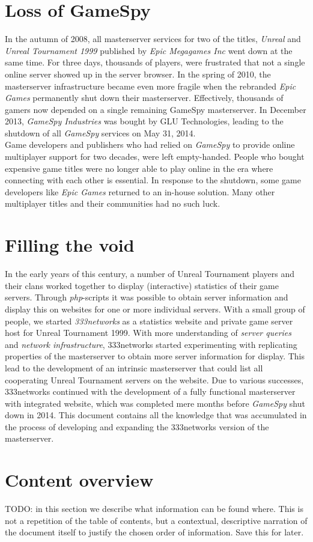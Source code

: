 \section{Loss of GameSpy}
In the autumn of 2008, all masterserver services for two of the titles, \emph{Unreal} and \emph{Unreal Tournament 1999} published by \emph{Epic Megagames Inc\textsuperscript{\textcopyright}} went down at the same time. For three days, thousands of players, were frustrated that not a single online server showed up in the server browser\cite{bu2008,ou2008}. In the spring of 2010, the masterserver infrastructure became even more fragile when the rebranded \emph{Epic Games} permanently shut down their masterserver. Effectively, thousands of gamers now depended on a single remaining GameSpy masterserver. In December 2013, \emph{GameSpy Industries} was bought by GLU Technologies, leading to the shutdown of all \emph{GameSpy} services on May 31, 2014\cite{nutt2014, stapleton2013}.\\

Game developers and publishers who had relied on \emph{GameSpy} to provide online multiplayer support for two decades, were left empty-handed. People who bought expensive game titles were no longer able to play online in the era where connecting with each other is essential. In response to the shutdown, some game developers like \emph{Epic Games} returned to an in-house solution. Many other multiplayer titles and their communities had no such luck.

\section{Filling the void}
In the early years of this century, a number of Unreal Tournament players and their clans worked together to display (interactive) statistics of their game servers. Through \emph{php}-scripts it was possible to obtain server information and display this on websites for one or more individual servers. With a small group of people, we started \emph{333networks} as a statistics website and private game server host for Unreal Tournament 1999. With more understanding of \emph{server queries} and \emph{network infrastructure}, 333networks started experimenting with replicating properties of the masterserver to obtain more server information for display. This lead to the development of an intrinsic masterserver that could list all cooperating Unreal Tournament servers on the website. Due to various successes, 333networks continued with the development of a fully functional masterserver with integrated website, which was completed mere months before \emph{GameSpy} shut down in 2014. This document contains all the knowledge that was accumulated in the process of developing and expanding the 333networks version of the masterserver.

\section{Content overview}
TODO: in this section we describe what information can be found where. This is not a repetition of the table of contents, but a contextual, descriptive narration of the document itself to justify the chosen order of information. Save this for later.
